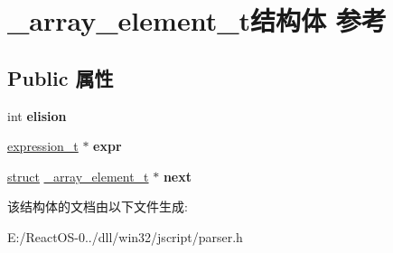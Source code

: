 \hypertarget{struct__array__element__t}{}\section{\+\_\+array\+\_\+element\+\_\+t结构体 参考}
\label{struct__array__element__t}
\subsection*{Public 属性}
\begin{DoxyCompactItemize}
\item 
\mbox{\label{struct__array__element__t_a39ed2317b751921d7f73f6571bb2a42b}} 
int {\bfseries elision}
\item 
\mbox{\label{struct__array__element__t_a685710e3e88aa267b67eb0e33f844aae}} 
\hyperlink{struct__expression__t}{expression\+\_\+t} $\ast$ {\bfseries expr}
\item 
\mbox{\label{struct__array__element__t_afcf1da2f028377e351500344b5ef26d2}} 
\hyperlink{interfacestruct}{struct} \hyperlink{struct__array__element__t}{\+\_\+array\+\_\+element\+\_\+t} $\ast$ {\bfseries next}
\end{DoxyCompactItemize}


该结构体的文档由以下文件生成\+:\begin{DoxyCompactItemize}
\item 
E\+:/\+React\+O\+S-\/0../dll/win32/jscript/parser.\+h\end{DoxyCompactItemize}
